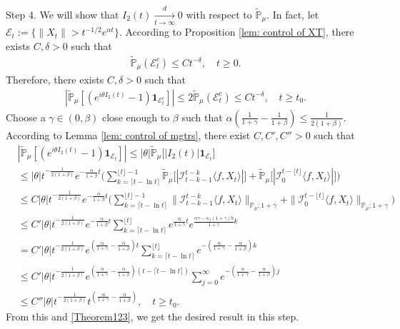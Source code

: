 \documentclass[12pt,a4paper]{amsart}
\theoremstyle{plain}
\theoremstyle{definition}
\numberwithin{equation}{section}
\begin{document}
    Step 4. We will show that $I_2(t) \xrightarrow[t\to \infty]{d} 0$ with respect to $\mathbb{\tilde{P}}_{\mu}$.
    In fact, let $\mathcal{E}_t:=\{\|X_t\|>t^{-1/2}e^{\alpha t}\}$. According to Proposition \ref{lem: control of XT}, there exists $C, \delta>0$ such that
\begin{equation}\begin{split}
    \mathbb{\tilde{P}}_{\mu}(\mathcal{E}^c_t)\leq C t^{-\delta}, \quad t\geq0.
\end{split}\end{equation}
    Therefore, there exists $C, \delta>0$ such that
\begin{equation}\begin{split}\label{Theorem123}
    |\mathbb{\tilde{P}}_{\mu}[(e^{i\theta I_2(t)}-1)\mathbf{1}_{\mathcal{E}^c_t}]|
    \leq 2\mathbb{\tilde{P}}_{\mu}(\mathcal{E}^c_t)\leq Ct^{-\delta},
    \quad t\geq t_0.
\end{split}\end{equation}
    Choose a $\gamma\in (0,\beta)$ close enough to $\beta$ such that $\alpha(\frac{1}{1+\gamma}-\frac{1}{1+\beta})\leq \frac{1}{2(1+\beta)}$.
	According to Lemma \ref{lem: control of mgtrs}, there exist $C,C',C''>0$ such that
\begin{align*}
    &|\mathbb{\tilde{P}}_{\mu} [ (e^{i\theta I_2(t)}-1)\mathbf{1}_{\mathcal{E}_t}]|
    \leq |\theta| \mathbb{\tilde{P}}_{\mu} \big[ |I_2(t)|\mathbf{1}_{\mathcal{E}_t}\big]
    \\&\leq|\theta| t^{-\frac{1}{2(1+\beta)}}e^{-\frac{\alpha}{1+\beta}t}\Big(\sum_{k=\lceil t-\ln t \rceil}^{\lfloor t \rfloor - 1}\mathbb{\tilde{P}}_{\mu}\big[| \mathcal{I}_{t-k-1}^{t-k}\langle f,X_t\rangle|\big] + \mathbb{\tilde{P}}_{\mu}\big[| \mathcal{I}_{0}^{t-\lfloor t\rfloor}\langle f,X_t\rangle|\big]\Big)
    \\& \leq C |\theta| t^{-\frac{1}{2(1+\beta)}}e^{-\frac{\alpha}{1+\beta}t}\Big(\sum_{k=\lceil t-\ln t \rceil}^{\lfloor t \rfloor - 1}\|\mathcal{I}_{t-k-1}^{t-k}\langle f,X_t\rangle\|_{\mathbb P_\mu; 1+\gamma} + \|\mathcal I_0^{t-\lfloor t \rfloor} \langle f, X_t\rangle\|_{\mathbb P_\mu;1+\gamma}\Big)
    \\ &\leq C' |\theta| t^{-\frac{1}{2(1+\beta)}}e^{-\frac{\alpha}{1+\beta}t}\sum_{k=\lceil t-\ln t \rceil}^{\lfloor t \rfloor}e^{\frac{\alpha}{1+\gamma}t}e^{\frac{\alpha\gamma-\kappa_f(1+\gamma)b}{1+\gamma}k}\\
    &= C' |\theta| t^{-\frac{1}{2(1+\beta)}}e^{(\frac{\alpha }{1+\gamma}-\frac{\alpha }{1+\beta})t} \sum_{k=\lceil t-\ln t \rceil}^{\lfloor t \rfloor}e^{-(\frac{\alpha}{1+\gamma}-\frac{\alpha}{1+\beta})k}\\
    &\leq C' |\theta| t^{-\frac{1}{2(1+\beta)}}e^{(\frac{\alpha }{1+\gamma}-\frac{\alpha }{1+\beta})(t - \lceil t - \ln t\rceil)} \sum_{j=0}^{\infty}e^{-(\frac{\alpha}{1+\gamma}-\frac{\alpha}{1+\beta})j}\\
    &\leq C''|\theta| t^{-\frac{1}{2(1+\beta)}}t^{(\frac{\alpha}{1+\gamma}- \frac{\alpha}{1+\beta})},
    \quad t\geq t_0.
\end{align*}
	From this and \eqref{Theorem123}, we get the desired result in this step.
\end{document}
